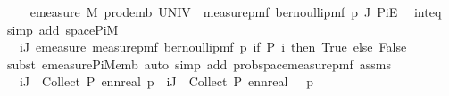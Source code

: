 \begin{isabellebody}
\ \isamarkupfalse%
\ {\isachardoublequoteopen}{\isachardot}{\kern0pt}{\isachardot}{\kern0pt}{\isachardot}{\kern0pt}\ {\isacharequal}{\kern0pt}\ emeasure\ {\isacharquery}{\kern0pt}M\ {\isacharparenleft}{\kern0pt}prod{\isacharunderscore}{\kern0pt}emb\ UNIV\ {\isacharparenleft}{\kern0pt}{\isasymlambda}{\isacharunderscore}{\kern0pt}{\isachardot}{\kern0pt}\ measure{\isacharunderscore}{\kern0pt}pmf\ {\isacharparenleft}{\kern0pt}bernoulli{\isacharunderscore}{\kern0pt}pmf\ p{\isacharparenright}{\kern0pt}{\isacharparenright}{\kern0pt}\ J\ {\isacharquery}{\kern0pt}PiE{\isacharparenright}{\kern0pt}{\isachardoublequoteclose}\ \isamarkupfalse%
\ inteq\ \isamarkupfalse%
\ {\isacharparenleft}{\kern0pt}simp\ add{\isacharcolon}{\kern0pt}\ space{\isacharunderscore}{\kern0pt}PiM{\isacharparenright}{\kern0pt}\isanewline
\ \ \isamarkupfalse%
\ \isamarkupfalse%
\ {\isachardoublequoteopen}{\isachardot}{\kern0pt}{\isachardot}{\kern0pt}{\isachardot}{\kern0pt}\ {\isacharequal}{\kern0pt}\ {\isacharparenleft}{\kern0pt}{\isasymProd}i{\isasymin}J{\isachardot}{\kern0pt}\ emeasure\ {\isacharparenleft}{\kern0pt}measure{\isacharunderscore}{\kern0pt}pmf\ {\isacharparenleft}{\kern0pt}bernoulli{\isacharunderscore}{\kern0pt}pmf\ p{\isacharparenright}{\kern0pt}{\isacharparenright}{\kern0pt}\ {\isacharparenleft}{\kern0pt}if\ P\ i\ then\ {\isacharbraceleft}{\kern0pt}True{\isacharbraceright}{\kern0pt}\ else\ {\isacharbraceleft}{\kern0pt}False{\isacharbraceright}{\kern0pt}{\isacharparenright}{\kern0pt}{\isacharparenright}{\kern0pt}{\isachardoublequoteclose}\ \isanewline
\ \ \ \ \isamarkupfalse%
\ {\isacharparenleft}{\kern0pt}subst\ emeasure{\isacharunderscore}{\kern0pt}PiM{\isacharunderscore}{\kern0pt}emb{\isacharparenright}{\kern0pt}\ {\isacharparenleft}{\kern0pt}auto\ simp\ add{\isacharcolon}{\kern0pt}\ prob{\isacharunderscore}{\kern0pt}space{\isacharunderscore}{\kern0pt}measure{\isacharunderscore}{\kern0pt}pmf\ assms{\isacharparenleft}{\kern0pt}{}{\isacharparenright}{\kern0pt}{\isacharparenright}{\kern0pt}\isanewline
\ \ \isamarkupfalse%
\ \isamarkupfalse%
\ {\isachardoublequoteopen}{\isachardot}{\kern0pt}{\isachardot}{\kern0pt}{\isachardot}{\kern0pt}\ {\isacharequal}{\kern0pt}\ {\isacharparenleft}{\kern0pt}{\isasymProd}i{\isasymin}J\ {\isasyminter}\ Collect\ P{\isachardot}{\kern0pt}\ ennreal\ p{\isacharparenright}{\kern0pt}\ {\isacharasterisk}{\kern0pt}\ {\isacharparenleft}{\kern0pt}{\isasymProd}i{\isasymin}J\ {\isacharminus}{\kern0pt}\ Collect\ P{\isachardot}{\kern0pt}\ ennreal\ {\isacharparenleft}{\kern0pt}{}\ {\isacharminus}{\kern0pt}\ p{\isacharparenright}{\kern0pt}{\isacharparenright}{\kern0pt}{\isachardoublequoteclose}\isanewline

\end{isabellebody}
